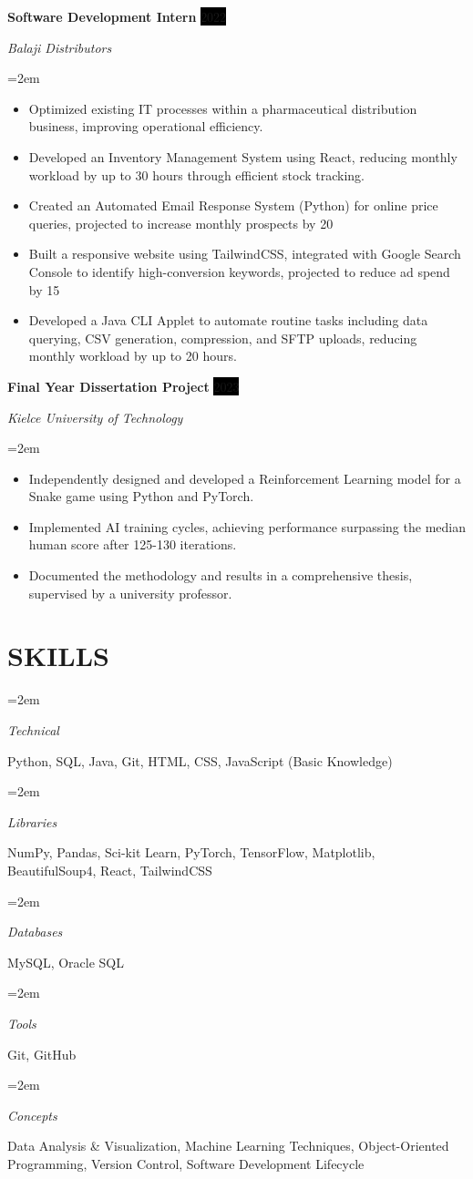\documentclass[paper=a4,fontsize=11pt]{scrartcl} %
\newlength{\spacebox}
\newcommand{\sepspace}{\vspace*{1em}} %
\newcommand{\NewPart}[1]{\section*{\uppercase{#1}}} %
\newcommand{\SkillsEntry}[2]{
\noindent\hangindent=2em\hangafter=0 %
\parbox{\spacebox}{        %
\textit{#1}}			   %
\hspace{1.5em} #2 \par}    %
\newcommand{\WorkEntry}[4]{
\noindent \textbf{#1} \hfill      %
\colorbox{Black}{\color{White}#2} \par %
\noindent \textit{#3} \par              %
\noindent\hangindent=2em\hangafter=0 \small #4 %
\normalsize \par} %
\begin{document}
\WorkEntry{Software Development Intern}{2022}{Balaji Distributors}{
\begin{itemize}[leftmargin=*,labelsep=0.5em]
    \item Optimized existing IT processes within a pharmaceutical distribution business, improving operational efficiency.
    \item Developed an Inventory Management System using React, reducing monthly workload by up to 30 hours through efficient stock tracking.
    \item Created an Automated Email Response System (Python) for online price queries, projected to increase monthly prospects by 20%
    \item Built a responsive website using TailwindCSS, integrated with Google Search Console to identify high-conversion keywords, projected to reduce ad spend by 15%
    \item Developed a Java CLI Applet to automate routine tasks including data querying, CSV generation, compression, and SFTP uploads, reducing monthly workload by up to 20 hours.
\end{itemize}
}
\sepspace %

\WorkEntry{Final Year Dissertation Project}{2023}{Kielce University of Technology}{
\begin{itemize}[leftmargin=*,labelsep=0.5em]
    \item Independently designed and developed a Reinforcement Learning model for a Snake game using Python and PyTorch.
    \item Implemented AI training cycles, achieving performance surpassing the median human score after 125-130 iterations.
    \item Documented the methodology and results in a comprehensive thesis, supervised by a university professor.
\end{itemize}
}

\NewPart{Skills}{}
\SkillsEntry{Technical}{Python, SQL, Java, Git, HTML, CSS, JavaScript (Basic Knowledge)}
\SkillsEntry{Libraries}{NumPy, Pandas, Sci-kit Learn, PyTorch, TensorFlow, Matplotlib, BeautifulSoup4, React, TailwindCSS}
\SkillsEntry{Databases}{MySQL, Oracle SQL}
\SkillsEntry{Tools}{Git, GitHub} %
\SkillsEntry{Concepts}{Data Analysis \& Visualization, Machine Learning Techniques, Object-Oriented Programming, Version Control, Software Development Lifecycle}
\end{document}
